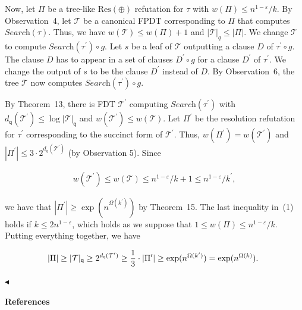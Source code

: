 Now, let $\Pi$ be a tree-like $\text{Res}(\oplus)$ refutation for $\tau$ with $w(\Pi)\leq n^{1-\varepsilon}/k$.
By Observation 4, let $\mathcal{T}$ be a canonical FPDT corresponding to $\Pi$ that computes $\textit{Search}(\tau)$.
Thus, we have $w(\mathcal{T})\leq w(\Pi)+1$ and $|\mathcal{T}|_{q}\leq|\Pi|$.
We change $\mathcal{T}$ to compute $\textit{Search}(\tau^{\prime})\circ g$.
Let $s$ be a leaf of $\mathcal{T}$ outputting a clause $D$ of $\tau^{\prime}\circ g$.
The clause $D$ has to appear in a set of clauses $D^{\prime}\circ g$ for a clause $D^{\prime}$ of $\tau^{\prime}$.
We change the output of $s$ to be the clause $D^{\prime}$ instead of $D$.
By Observation 6, the tree $\mathcal{T}$ now computes $\textit{Search}(\tau^{\prime})\circ g$.\par




By Theorem 13, there is FDT $\mathcal{T}^{\prime}$ computing $\textit{Search}(\tau^{\prime})$ with $d_{\mathsf{q}}(\mathcal{T}^{\prime})\leq\log|\mathcal{T}|_{\mathsf{q}}$ and $w(\mathcal{T}^{\prime})\leq w(\mathcal{T})$.
Let $\Pi^{\prime}$ be the resolution refutation for $\tau^{\prime}$ corresponding to the succinct form of $\mathcal{T}^{\prime}$.
Thus, $w(\Pi^{\prime})=w(\mathcal{T}^{\prime})$ and $|\Pi^{\prime}|\leq 3\cdot 2^{d_{\mathsf{q}}(\mathcal{T}^{\prime})}$ (by Observation 5).
Since\par


\[\begin{gathered}
w(\mathcal{T}^{\prime})\leq w(\mathcal{T})\leq n^{1-\varepsilon}/k+1\leq n^{1-%
\varepsilon}/k^{\prime},
\end{gathered}\]


we have that $|\Pi^{\prime}|\geq\exp(n^{\Omega(k^{\prime})})$ by Theorem 15.
The last inequality in (1) holds if $k\leq 2n^{1-\varepsilon}$, which holds as we suppose that $1\leq w(\Pi)\leq n^{1-\varepsilon}/k$.
Putting everything together, we have\par


\[\begin{gathered}
|\Pi|\geq|\mathcal{T}|_{\mathsf{q}}\geq 2^{d_{\mathsf{q}}(\mathcal{T}^{\prime}%
)}\geq\frac{1}{3}\cdot|\Pi^{\prime}|\geq\exp(n^{\Omega(k^{\prime})})=\exp(n^{%
\Omega(k)}).\
\end{gathered}\]


$\blacktriangleleft$\par






\par\medskip\noindent\textbf{References}\par



